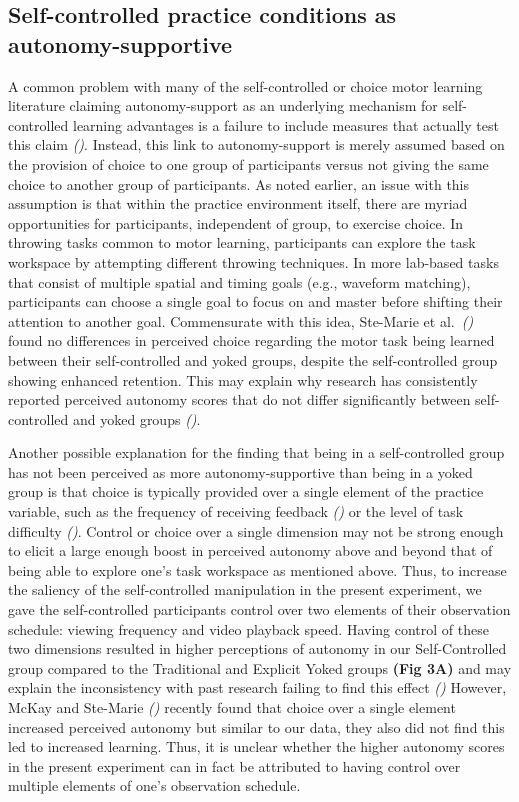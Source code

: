 \documentclass[
  english,
  jou]{apa7}
\begin{document}
\hypertarget{self-controlled-practice-conditions-as-autonomy-supportive}{%
\subsection{Self-controlled practice conditions as autonomy-supportive}\label{self-controlled-practice-conditions-as-autonomy-supportive}}

A common problem with many of the self-controlled or choice motor learning literature claiming autonomy-support as an underlying mechanism for self-controlled learning advantages is a failure to include measures that actually test this claim \emph{()}. Instead, this link to autonomy-support is merely assumed based on the provision of choice to one group of participants versus not giving the same choice to another group of participants. As noted earlier, an issue with this assumption is that within the practice environment itself, there are myriad opportunities for participants, independent of group, to exercise choice. In throwing tasks common to motor learning, participants can explore the task workspace by attempting different throwing techniques. In more lab-based tasks that consist of multiple spatial and timing goals (e.g., waveform matching), participants can choose a single goal to focus on and master before shifting their attention to another goal. Commensurate with this idea, Ste-Marie et al.~\emph{()} found no differences in perceived choice regarding the motor task being learned between their self-controlled and yoked groups, despite the self-controlled group showing enhanced retention. This may explain why research has consistently reported perceived autonomy scores that do not differ significantly between self-controlled and yoked groups \emph{()}.

Another possible explanation for the finding that being in a self-controlled group has not been perceived as more autonomy-supportive than being in a yoked group is that choice is typically provided over a single element of the practice variable, such as the frequency of receiving feedback \emph{()} or the level of task difficulty \emph{()}. Control or choice over a single dimension may not be strong enough to elicit a large enough boost in perceived autonomy above and beyond that of being able to explore one's task workspace as mentioned above. Thus, to increase the saliency of the self-controlled manipulation in the present experiment, we gave the self-controlled participants control over two elements of their observation schedule: viewing frequency and video playback speed. Having control of these two dimensions resulted in higher perceptions of autonomy in our Self-Controlled group compared to the Traditional and Explicit Yoked groups \textbf{(Fig 3A)} and may explain the inconsistency with past research failing to find this effect \emph{()} However, McKay and Ste-Marie \emph{()} recently found that choice over a single element increased perceived autonomy but similar to our data, they also did not find this led to increased learning. Thus, it is unclear whether the higher autonomy scores in the present experiment can in fact be attributed to having control over multiple elements of one's observation schedule.
\end{document}
